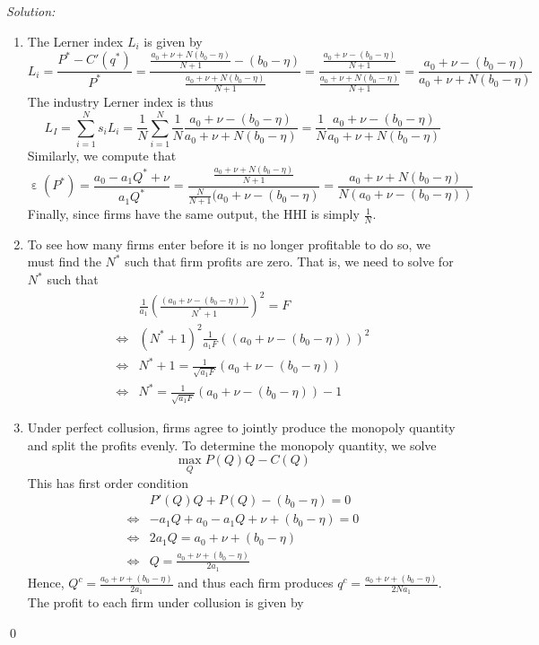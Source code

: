 \documentclass[12pt]{article}
\DeclareMathOperator{\eps}{\varepsilon}
\newenvironment{sol}
    {\emph{Solution:}
    }
    {
    \qed
    }
\begin{document}
\begin{sol}
\begin{enumerate}[label=\alph*) ]
     \item The Lerner index $L_i$ is given by
     \[L_i = \frac{P^* - C'(q^*)}{P^*} = \frac{\frac{a_0 + \nu + N(b_0 - \eta)}{N+1} - (b_0 - \eta)}{\frac{a_0 + \nu + N(b_0 - \eta)}{N+1} } = \frac{\frac{a_0 + \nu - (b_0 - \eta)}{N+1}}{\frac{a_0 + \nu + N(b_0 - \eta)}{N+1}} = \frac{a_0 + \nu - (b_0 - \eta)}{a_0 + \nu + N(b_0 - \eta)}\]
     The industry Lerner index is thus
     \[L_I = \sum_{i=1}^N s_i L_i = \frac{1}{N} \sum_{i=1}^N \frac{1}{N} \frac{a_0 + \nu - (b_0 - \eta)}{a_0 + \nu + N(b_0 - \eta)} =\frac{1}{N}\frac{a_0 + \nu - (b_0 - \eta)}{a_0 + \nu + N(b_0 - \eta)} \]
     Similarly, we compute that
     \[\eps(P^*) = \frac{a_0 - a_1 Q^* + \nu}{a_1 Q^*} = \frac{\frac{a_0 + \nu + N(b_0 - \eta)}{N+1}}{\frac{N}{N+1}(a_0 + \nu - (b_0 - \eta)} = \frac{a_0 + \nu + N(b_0 - \eta)}{N(a_0 + \nu - (b_0 - \eta))}\]
     Finally, since firms have the same output, the HHI is simply $\frac{1}{N}$.
     \item To see how many firms enter before it is no longer profitable to do so, we must find the $N^*$ such that firm profits are zero. That is, we need to solve for $N^*$ such that
     \begin{align*}
        &\frac{1}{a_1}\left(\frac{(a_0 + \nu - (b_0 - \eta))}{N^*+1}\right)^2 = F\\
        \iff & (N^*+1)^2\frac{1}{a_1 F }\left((a_0 + \nu - (b_0 - \eta))\right)^2\\
        \iff& N^* +1 = \frac{1}{\sqrt{a_1 F}}(a_0 + \nu - (b_0 - \eta))\\
        \iff& N^* =  \frac{1}{\sqrt{a_1 F}}(a_0 + \nu - (b_0 - \eta)) - 1
     \end{align*}
     \item Under perfect collusion, firms agree to jointly produce the monopoly quantity and split the profits evenly. To determine the monopoly quantity, we solve
     \[\max_{Q} P(Q)Q - C(Q)\]
     This has first order condition
     \begin{align*}
        &P'(Q) Q + P(Q) - (b_0 - \eta) = 0\\
        \iff & - a_1 Q + a_0 - a_1Q + \nu + (b_0 - \eta) = 0\\
        \iff & 2 a_1 Q = a_0 + \nu + (b_0 - \eta)\\
        \iff & Q = \frac{a_0 + \nu + (b_0 - \eta)}{2 a_1}
     \end{align*}
     Hence, $Q^c = \frac{a_0 + \nu + (b_0 - \eta)}{2 a_1}$ and thus each firm produces $q^c = \frac{a_0 + \nu + (b_0 - \eta)}{2 N a_1}$. The profit to each firm under collusion is given by

\end{enumerate}
\end{sol}
\end{document}

